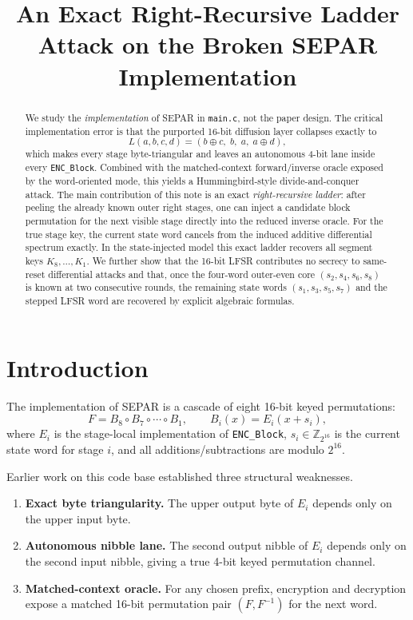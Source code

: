 \documentclass[11pt]{article}
\title{An Exact Right-Recursive Ladder Attack on the Broken SEPAR Implementation}
\author{}
\date{}
\begin{document}
\maketitle

\begin{abstract}
We study the \emph{implementation} of SEPAR in \texttt{main.c}, not the paper design. The critical implementation error is that the purported 16-bit diffusion layer collapses exactly to
\[
L(a,b,c,d)=(b\oplus c,\; b,\; a,\; a\oplus d),
\]
which makes every stage byte-triangular and leaves an autonomous 4-bit lane inside every \texttt{ENC\_Block}. Combined with the matched-context forward/inverse oracle exposed by the word-oriented mode, this yields a Hummingbird-style divide-and-conquer attack. The main contribution of this note is an exact \emph{right-recursive ladder}: after peeling the already known outer right stages, one can inject a candidate block permutation for the next visible stage directly into the reduced inverse oracle. For the true stage key, the current state word cancels from the induced additive differential spectrum exactly. In the state-injected model this exact ladder recovers all segment keys $K_8,\dots,K_1$. We further show that the 16-bit LFSR contributes no secrecy to same-reset differential attacks and that, once the four-word outer-even core $(s_2,s_4,s_6,s_8)$ is known at two consecutive rounds, the remaining state words $(s_1,s_3,s_5,s_7)$ and the stepped LFSR word are recovered by explicit algebraic formulas.
\end{abstract}

\section{Introduction}
The implementation of SEPAR is a cascade of eight 16-bit keyed permutations:
\[
F = B_8 \circ B_7 \circ \cdots \circ B_1,
\qquad
B_i(x)=E_i(x+s_i),
\]
where $E_i$ is the stage-local implementation of \texttt{ENC\_Block}, $s_i\in \mathbb{Z}_{2^{16}}$ is the current state word for stage $i$, and all additions/subtractions are modulo $2^{16}$.

Earlier work on this code base established three structural weaknesses.
\begin{enumerate}[label=(\roman*)]
\item \textbf{Exact byte triangularity.} The upper output byte of $E_i$ depends only on the upper input byte.
\item \textbf{Autonomous nibble lane.} The second output nibble of $E_i$ depends only on the second input nibble, giving a true 4-bit keyed permutation channel.
\item \textbf{Matched-context oracle.} For any chosen prefix, encryption and decryption expose a matched 16-bit permutation pair $(F,F^{-1})$ for the next word.
\end{enumerate}
\end{document}
